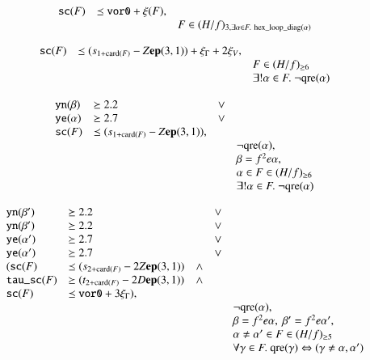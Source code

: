 \begin{equation}  %
    \begin{array}{lll}
    \optt{sc}(F) &\sle \optt{vor0} + \xi(F),\\
    &&F\in (H/f)_{3,\exists\alpha\in F.\ \op{hex\_loop\_diag}(\alpha)}
    \end{array}
\end{equation}

\begin{equation}  %
    \begin{array}{lll}
    \optt{sc}(F) & \sle (s_{1+\card(F)} - Z\y{(3,1)}) + \xi_\Gamma + 2 \xi_V,\\
    &&F\in (H/f)_{\ge6}\\
    &&\exists!\alpha\in F.\ \neg\op{qre}(\alpha)
    \end{array}
\end{equation}

\begin{equation}  %
    \begin{array}{llll}
    \optt{yn}(\beta)&\sge 2.2&\vee\\
    \optt{ye}(\alpha)&\sge 2.7&\vee\\
    \optt{sc}(F) & \sle (s_{1+\card(F)} - Z\y{(3,1)}),\\
    &&&\neg\op{qre}(\alpha),\\
    &&&\beta=f^2e\alpha,\\
    &&&\alpha\in F\in (H/f)_{\ge6}\\
    &&&\exists!\alpha\in F.\ \neg\op{qre}(\alpha)
    \end{array}
\end{equation}

\begin{equation}
    \begin{array}{lllll}
    {\operatorname{{\texttt{yn}}}}(\beta')&\succeq 2.2&&\vee\\
    {\operatorname{{\texttt{yn}}}}(\beta')&\succeq 2.2&&\vee\\
    {\operatorname{{\texttt{ye}}}}(\alpha')&\succeq 2.7&&\vee\\
        {\operatorname{{\texttt{ye}}}}(\alpha')&\succeq 2.7&&\vee\\
    ({\operatorname{{\texttt{sc}}}}(F) & \preceq (s_{2+{\operatorname{card}}(F)} - 2 Z{\operatorname{\bf ep}}{(3,1)})&\wedge \\
    {\operatorname{{\texttt{tau\_sc}}}}(F) & \succeq (t_{2+{\operatorname{card}}(F)} - 2 D{\operatorname{\bf ep}}{(3,1)})&\wedge \\
    {\operatorname{{\texttt{sc}}}}(F) & \preceq {\operatorname{{\texttt{vor0}}}} + 3\xi_\Gamma), \\
    &&&&\neg{\operatorname{qre}}(\alpha),\\
    &&&&\beta=f^2e\alpha,\ \beta'=f^2e\alpha',\\
    &&&&\alpha\ne\alpha'\in F\in (H/f)_{\ge5}\\
    &&&&\forall\gamma\in F.\ {\operatorname{qre}}(\gamma)\Leftrightarrow (\gamma\ne\alpha,\alpha')\\
    \end{array}
\end{equation}

